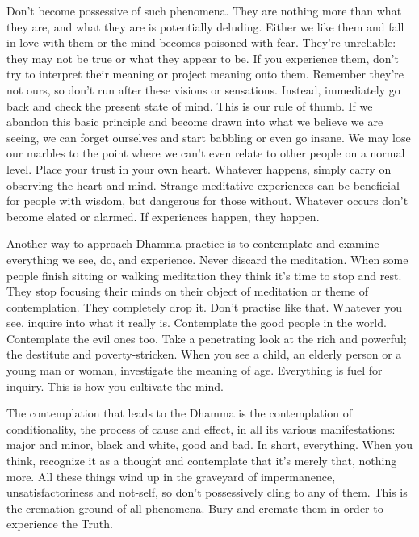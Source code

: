 Don't become possessive of such phenomena. They are nothing more than what they are, and what they are is potentially deluding. Either we like them and fall in love with them or the mind becomes poisoned with fear. They're unreliable: they may not be true or what they appear to be. If you experience them, don't try to interpret their meaning or project meaning onto them. Remember they're not ours, so don't run after these visions or sensations. Instead, immediately go back and check the present state of mind. This is our rule of thumb. If we abandon this basic principle and become drawn into what we believe we are seeing, we can forget ourselves and start babbling or even go insane. We may lose our marbles to the point where we can't even relate to other people on a normal level. Place your trust in your own heart. Whatever happens, simply carry on observing the heart and mind. Strange meditative experiences can be beneficial for people with wisdom, but dangerous for those without. Whatever occurs don't become elated or alarmed. If experiences happen, they happen.

Another way to approach Dhamma practice is to contemplate and examine everything we see, do, and experience. Never discard the meditation. When some people finish sitting or walking meditation they think it's time to stop and rest. They stop focusing their minds on their object of meditation or theme of contemplation. They completely drop it. Don't practise like that. Whatever you see, inquire into what it really is. Contemplate the good people in the world. Contemplate the evil ones too. Take a penetrating look at the rich and powerful; the destitute and poverty-stricken. When you see a child, an elderly person or a young man or woman, investigate the meaning of age. Everything is fuel for inquiry. This is how you cultivate the mind.

The contemplation that leads to the Dhamma is the contemplation of conditionality, the process of cause and effect, in all its various manifestations: major and minor, black and white, good and bad. In short, everything. When you think, recognize it as a thought and contemplate that it's merely that, nothing more. All these things wind up in the graveyard of impermanence, unsatisfactoriness and not-self, so don't possessively cling to any of them. This is the cremation ground of all phenomena. Bury and cremate them in order to experience the Truth.

